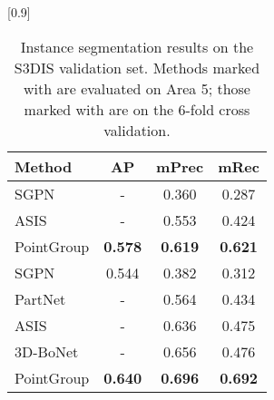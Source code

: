 \documentclass[10pt,twocolumn,letterpaper]{article}
\begin{document}
\begin{table}
	\vspace{1mm}
	\begin{center}
		\scalebox{0.85}[0.9]{
			\begin{tabular}{ l | c c c}
				\hline
				Method & AP & mPrec & mRec \\
				\hline
				SGPN~\cite{wang2018sgpn} & - & 0.360 & 0.287 \\
				ASIS~\cite{wang2019associatively} & - & 0.553 & 0.424 \\
				PointGroup & \textbf{0.578} & \textbf{0.619} & \textbf{0.621} \\
				\hline
				SGPN~\cite{wang2018sgpn} & 0.544 & 0.382 & 0.312 \\
				PartNet~\cite{mo2019partnet} & - & 0.564 & 0.434 \\
				ASIS~\cite{wang2019associatively} & - & 0.636 & 0.475 \\
				3D-BoNet~\cite{yang2019learning} & - & 0.656 & 0.476 \\
				PointGroup & \textbf{0.640} & \textbf{0.696} & \textbf{0.692} \\
				\hline
			\end{tabular}
		}
	\end{center}
	\vspace{-4mm}
	\caption{Instance segmentation results on the S3DIS validation set.  Methods marked with  are evaluated on Area 5; those marked with  are on the 6-fold cross validation. 
	}
	\label{tab:s3dis-compare}
\end{table}
\end{document}
